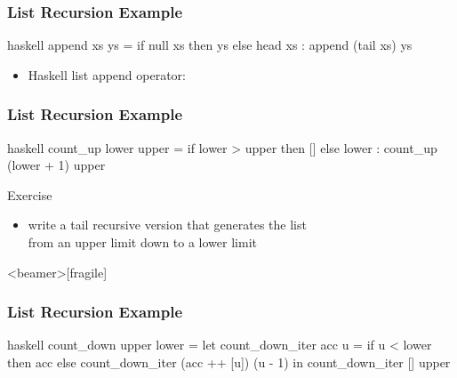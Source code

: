 \documentclass[dvipsnames]{beamer}
\theoremstyle{plain}
\begin{document}
\begin{frame}[fragile]
  \frametitle{List Recursion Example}

  \begin{example}
    \pause
    \begin{pygments}{haskell}
append xs ys =
    if null xs
    then ys
    else head xs : append (tail xs) ys
    \end{pygments}
  \end{example}

  \pause
  \begin{itemize}
    \item Haskell list append operator: 
  \end{itemize}
\end{frame}

\begin{frame}[fragile]
  \frametitle{List Recursion Example}

  \begin{example}
    \pause
    \begin{pygments}{haskell}
count_up lower upper =
    if lower > upper
    then []
    else lower : count_up (lower + 1) upper
    \end{pygments}
  \end{example}

  \pause
  \begin{block}{Exercise}
    \begin{itemize}
      \item write a tail recursive version that generates the list\\
        from an upper limit down to a lower limit
    \end{itemize}
  \end{block}
\end{frame}

\begin{frame}<beamer>[fragile]
  \frametitle{List Recursion Example}

  \begin{example}
    \begin{pygments}{haskell}
count_down upper lower =
    let
        count_down_iter acc u =
            if u < lower
            then acc
            else count_down_iter (acc ++ [u]) (u - 1)
    in
        count_down_iter [] upper
    \end{pygments}

  \end{example}
\end{frame}
\end{document}
